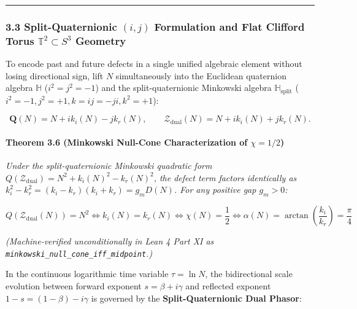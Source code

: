 \documentclass[
  11pt,
]{article}
\begin{document}
\begin{center}\rule{0.5\linewidth}{0.5pt}\end{center}

\subsubsection{\texorpdfstring{3.3 Split-Quaternionic \((i, j)\)
Formulation and Flat Clifford Torus \(\mathbb{T}^2 \subset S^3\)
Geometry}{3.3 Split-Quaternionic (i, j) Formulation and Flat Clifford Torus \textbackslash mathbb\{T\}\^{}2 \textbackslash subset S\^{}3 Geometry}}\label{split-quaternionic-i-j-formulation-and-flat-clifford-torus-mathbbt2-subset-s3-geometry}

To encode past and future defects in a single unified algebraic element
without losing directional sign, lift \(N\) simultaneously into the
Euclidean quaternion algebra \(\mathbb{H}\) (\(i^2 = j^2 = -1\)) and the
split-quaternionic Minkowski algebra \(\mathbb{H}_{\text{split}}\)
(\(i^2 = -1, j^2 = +1, k = ij = -ji, k^2 = +1\)):

\[\mathbf{Q}(N) = N + i k_i(N) - j k_r(N), \qquad \mathcal{Z}_{\text{dual}}(N) = N + i k_i(N) + j k_r(N).\]

\paragraph{\texorpdfstring{Theorem 3.6 (Minkowski Null-Cone
Characterization of
\(\chi = 1/2\))}{Theorem 3.6 (Minkowski Null-Cone Characterization of \textbackslash chi = 1/2)}}\label{theorem-3.6-minkowski-null-cone-characterization-of-chi-12}

\emph{Under the split-quaternionic Minkowski quadratic form
\(Q(\mathcal{Z}_{\text{dual}}) = N^2 + k_i(N)^2 - k_r(N)^2\), the defect
term factors identically as
\(k_i^2 - k_r^2 = (k_i - k_r)(k_i + k_r) = g_m D(N)\). For any positive
gap \(g_m > 0\):}

\[Q(\mathcal{Z}_{\text{dual}}(N)) = N^2 \iff k_i(N) = k_r(N) \iff \chi(N) = \frac{1}{2} \iff \alpha(N) = \arctan\!\left(\frac{k_i}{k_r}\right) = \frac{\pi}{4}\]

\emph{(Machine-verified unconditionally in Lean 4 Part XI as
\texttt{minkowski\_null\_cone\_iff\_midpoint}.)}

In the continuous logarithmic time variable \(\tau = \ln N\), the
bidirectional scale evolution between forward exponent
\(s = \beta + i\gamma\) and reflected exponent
\(1 - s = (1-\beta) - i\gamma\) is governed by the
\textbf{Split-Quaternionic Dual Phasor}:
\end{document}
